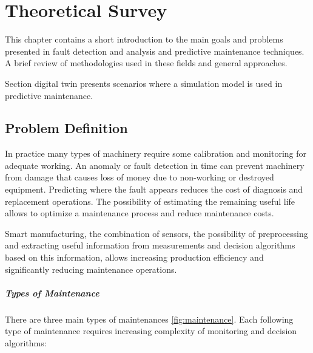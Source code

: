 
\chapter{Theoretical Survey}\label{ch:teor_surv}

This chapter contains a short introduction to the main goals and problems
presented in fault detection and analysis and predictive maintenance
techniques. A brief review of methodologies used in these fields and
general approaches.

Section digital twin presents scenarios where a simulation model is used in
predictive maintenance. 


% 

\section{Problem Definition}


In practice many types of machinery require some calibration and monitoring
for adequate working. An anomaly or fault detection in time can prevent
machinery from damage that causes loss of money due to non-working or
destroyed equipment.  Predicting where the fault appears reduces the cost
of diagnosis and replacement operations. The possibility of estimating the
remaining useful life allows to optimize a maintenance process and reduce
maintenance costs.


Smart manufacturing, the combination of sensors, the possibility of
preprocessing and extracting useful information from measurements and
decision algorithms based on this information, allows increasing production
efficiency and significantly reducing maintenance operations.



\paragraph{Types of Maintenance} There are three main types of maintenances
\ref{fig:maintenance}. Each following type of maintenance requires
increasing complexity of monitoring
and decision algorithms:

